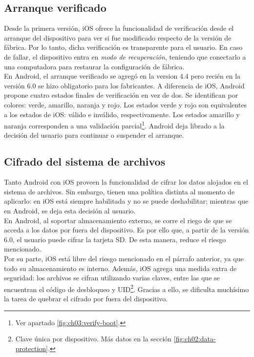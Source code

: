 \subsection{Arranque verificado}
Desde la primera versión, iOS ofrece la funcionalidad de verificación desde el arranque del dispositivo para ver si fue modificado respecto de la versión de fábrica. Por lo tanto, dicha verificación es transparente para el usuario. En caso de fallar, el dispositivo entra en \emph{modo de recuperación}, teniendo que conectarlo a una computadora para restaurar la configuración de fábrica.\\

En Android, el arranque verificado se agregó en la version 4.4 pero recién en la versión 6.0 se hizo obligatorio para los fabricantes. A diferencia de iOS, Android propone cuatro estados finales de verificación en vez de dos. Se identifican por colores: verde, amarillo, naranja y rojo. Los estados verde y rojo son equivalentes a los estados de iOS: válido e inválido, respectivamente. Los estados amarillo y naranja corresponden a una validación parcial\footnote{Ver apartado \ref{fig:ch03:verify-boot}.}. Android deja librado a la decisión del usuario para continuar o suspender el arranque.
\subsection{Cifrado del sistema de archivos}
Tanto Android con iOS proveen la funcionalidad de cifrar los datos alojados en el sistema de archivos. Sin embargo, tienen una política distinta al momento de aplicarlo: en iOS está siempre habilitada y no se puede deshabilitar; mientras que en Android, se deja esta decisión al usuario.\\

En Android, al soportar almacenamiento externo, se corre el riego de que se acceda a los datos por fuera del dispositivo. Es por ello que, a partir de la versión 6.0, el usuario puede cifrar la tarjeta SD. De esta manera, reduce el riesgo mencionado.\\

Por su parte, iOS está libre del riesgo mencionado en el párrafo anterior, ya que todo su almacenamiento es interno. Además, iOS agrega una medida extra de seguridad: los archivos se cifran utilizando varias claves, entre las que se encuentran el código de desbloqueo y UID\footnote{Clave única por dispositivo. Más datos en la sección \ref{fig:ch02:data-protection}.}. Gracias a ello, se dificulta muchísimo la tarea de quebrar el cifrado por fuera del dispositivo.
